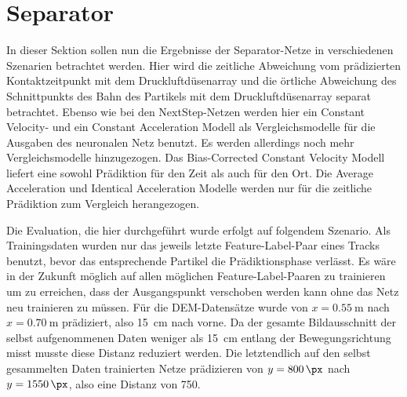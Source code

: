 


\section{Separator}





In dieser Sektion sollen nun die Ergebnisse der Separator-Netze in verschiedenen Szenarien betrachtet werden.
Hier wird  die zeitliche Abweichung vom prädizierten Kontaktzeitpunkt mit dem Druckluftdüsenarray und die örtliche Abweichung des Schnittpunkts des Bahn des Partikels mit dem Druckluftdüsenarray separat betrachtet.
Ebenso wie bei den NextStep-Netzen werden hier ein Constant Velocity- und ein Constant Acceleration Modell als Vergleichsmodelle für die Ausgaben des neuronalen Netz benutzt.
Es werden allerdings noch mehr Vergleichsmodelle hinzugezogen. 
Das Bias-Corrected Constant Velocity Modell liefert eine sowohl Prädiktion für den Zeit als auch für den Ort.
Die Average Acceleration und Identical Acceleration Modelle werden nur für die zeitliche Prädiktion zum Vergleich herangezogen.

Die Evaluation, die hier durchgeführt wurde erfolgt auf folgendem Szenario.
Als Trainingsdaten wurden nur das jeweils letzte Feature-Label-Paar eines Tracks benutzt, bevor das entsprechende Partikel die Prädiktionsphase verlässt.
Es wäre in der Zukunft möglich auf allen möglichen Feature-Label-Paaren zu trainieren um zu erreichen, dass der Ausgangspunkt verschoben werden kann ohne das Netz neu trainieren zu müssen.
Für die DEM-Datensätze wurde von \(x = \SI{0.55}{\meter}\) nach \(x = \SI{0.70}{\meter}\) prädiziert, also \SI{15}{\centi\meter} nach vorne.
Da der gesamte Bildausschnitt der selbst aufgenommenen Daten weniger als \SI{15}{\centi\meter} entlang der Bewegungsrichtung misst musste diese Distanz reduziert werden.
Die letztendlich auf den selbst gesammelten Daten trainierten Netze prädizieren von \(y = \SI{800}{\px}\) nach \(y = \SI{1550}{\px}\), also eine Distanz von \SI{750}{\px}.


